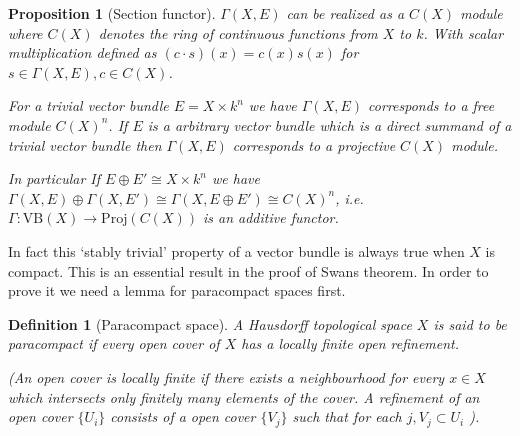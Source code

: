 \documentclass[12pt]{article}
\numberwithin{equation}{section}
\newcounter{dummy} \numberwithin{dummy}{section}
\newtheorem{definition}[dummy]{Definition}
\newtheorem{proposition}[dummy]{Proposition}
\begin{document}
	\begin{proposition}[Section functor]\label{sectionfunctor}
		 $\Gamma(X,E)$ can be realized as a $C(X)$ module where $C(X)$ denotes the ring of continuous functions from $X$ to $k$. With scalar multiplication defined as $(c \cdot s)(x)=c(x) s(x)$ for $s\in \Gamma(X,E), c \in C(X)$.
		 
		 For a trivial vector bundle $E=X \times k^n$ we have $\Gamma(X,E)$ corresponds to a free module $ C(X)^n$. If $E$ is a arbitrary vector bundle which is a direct summand of a trivial vector bundle then $\Gamma(X,E) $ corresponds to a projective $C(X)$ module.
		 
		 In particular If $E \oplus E' \cong X \times k^n$ we have $\Gamma(X, E) \oplus \Gamma(X,E') \cong \Gamma(X, E \oplus E') \cong C(X)^n$, i.e. $\Gamma: \mathrm{VB}(X) \to \mathrm{Proj}(C(X))$ is an additive functor.
	\end{proposition}
	
	In fact this `stably trivial' property of a vector bundle is always true when $X$ is compact. This is an essential result in the proof of Swans theorem. In order to prove it we need a lemma for paracompact spaces first.
	\begin{definition}[Paracompact space]
		A  Hausdorff topological space $X$ is said to be paracompact if every open cover of $X$ has a locally finite open refinement.
		
		(An open cover is locally finite if there exists a neighbourhood for every $x \in X$ which intersects only finitely many elements of the cover.
		A refinement of an open cover $\{U_i\}$ consists of a open cover $\{V_j\}$ such that for each $j, V_j	\subset U_i$ ).
	\end{definition}
	
\end{document}
